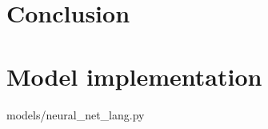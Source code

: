 \documentclass[12pt]{article}
\begin{document}
\section{Conclusion}





\appendix
\section{Model implementation}



{models/neural_net_lang.py}



\end{document}
